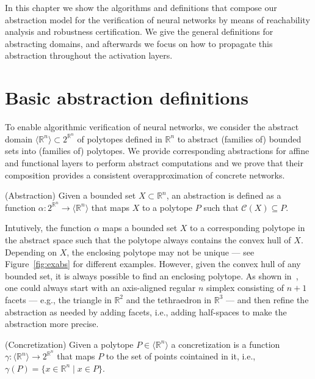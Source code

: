 In this chapter we show the algorithms and definitions that compose our
abstraction model for the verification of neural networks by means of
reachability analysis and robustness certification. We give the general 
definitions for abstracting domains, and afterwards we focus on how to 
propagate this abstraction throughout the activation layers.

\section{Basic abstraction definitions}
\label{sec:abstr}

To enable algorithmic verification of neural networks, we consider the
abstract domain $\langle \mathbb{R}^n \rangle \subset 2^{\mathbb{R}^n}$ 
of polytopes defined in $\mathbb{R}^n$ to abstract (families of) bounded
sets into (families of) polytopes. We provide corresponding
abstractions for affine and functional layers to perform abstract
computations and we prove that their composition provides a consistent
overapproximation of concrete networks.

\begin{definition}{(Abstraction)}
\label{def:abs}
\normalfont Given a bounded set $X \subset \mathbb{R}^n$,
an abstraction is defined as a function $\alpha : 2^{\mathbb{R}^n} \to
\langle \mathbb{R}^n \rangle$
that maps $X$ to a polytope $P$ such
that $\mathcal{C}(X) \subseteq P$.
\end{definition}

Intutively, the function $\alpha$ maps a bounded set $X$ to a
corresponding polytope in the abstract space such that the polytope
always contains the convex hull of $X$. Depending on $X$, the
enclosing polytope may not be unique --- see Figure~\ref{fig:exabs}
for different examples. However, given the convex hull of any bounded
set, it is always possible to find an enclosing polytope. As shown
in~\cite{zheng2019computing}, one could always start with 
an axis-aligned regular $n$ simplex consisting of $n+1$ facets ---
e.g., the
triangle in $\mathbb{R}^2$ and the tethraedron in $\mathbb{R}^3$ ---
and then refine the abstraction as needed by adding facets, i.e.,
adding half-spaces to make the abstraction more precise. 

\begin{definition}{(Concretization)}
\label{def:concr}
\normalfont Given a polytope $P \in \langle \mathbb{R}^n \rangle$
a concretization is a function $\gamma : \langle \mathbb{R}^n \rangle
\to 2^{\mathbb{R}^n}$ that maps $P$ to the set of points cointained in
it, i.e., $\gamma(P) = \{ x \in \mathbb{R}^n \mid x \in P \}$.
\end{definition}

